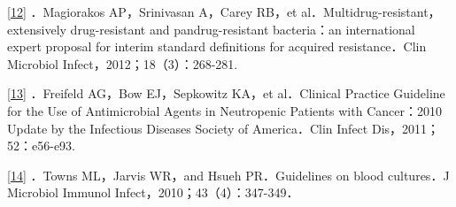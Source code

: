 \protect\hyperlink{text00031.htmlux5cux23ch12-30-back}{{[}12{]}}
．Magiorakos AP，Srinivasan A，Carey RB，et
al．Multidrug-resistant，extensively drug-resistant and
pandrug-resistant bacteria：an international expert proposal for interim
standard definitions for acquired resistance．Clin Microbiol
Infect，2012；18（3）：268-281.

\protect\hyperlink{text00031.htmlux5cux23ch13-30-back}{{[}13{]}}
．Freifeld AG，Bow EJ，Sepkowitz KA，et al．Clinical Practice Guideline
for the Use of Antimicrobial Agents in Neutropenic Patients with
Cancer：2010 Update by the Infectious Diseases Society of America．Clin
Infect Dis，2011；52：e56-e93.

\protect\hyperlink{text00031.htmlux5cux23ch14-30-back}{{[}14{]}} ．Towns
ML，Jarvis WR，and Hsueh PR．Guidelines on blood cultures．J Microbiol
Immunol Infect，2010；43（4）：347-349．

\protect\hypertarget{text00032.html}{}{}

